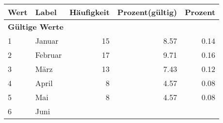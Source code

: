      \begin{longtable}{lXrrr}
     \toprule
     \textbf{Wert} & \textbf{Label} & \textbf{Häufigkeit} & \textbf{Prozent(gültig)} & \textbf{Prozent} \\
     \endhead
     \midrule
     \multicolumn{5}{l}{\textbf{Gültige Werte}}\\

     1 &
     \multicolumn{1}{X}{ Januar   } &


       \num{15} &
       \num[round-mode=places,round-precision=2]{8,57} &
         \num[round-mode=places,round-precision=2]{0,14} \\

     2 &
     \multicolumn{1}{X}{ Februar   } &


       \num{17} &
       \num[round-mode=places,round-precision=2]{9,71} &
         \num[round-mode=places,round-precision=2]{0,16} \\

     3 &
     \multicolumn{1}{X}{ März   } &


       \num{13} &
       \num[round-mode=places,round-precision=2]{7,43} &
         \num[round-mode=places,round-precision=2]{0,12} \\

     4 &
     \multicolumn{1}{X}{ April   } &


       \num{8} &
       \num[round-mode=places,round-precision=2]{4,57} &
         \num[round-mode=places,round-precision=2]{0,08} \\

     5 &
     \multicolumn{1}{X}{ Mai   } &


       \num{8} &
       \num[round-mode=places,round-precision=2]{4,57} &
         \num[round-mode=places,round-precision=2]{0,08} \\

     6 &
     \multicolumn{1}{X}{ Juni   } &



\end{longtable}
